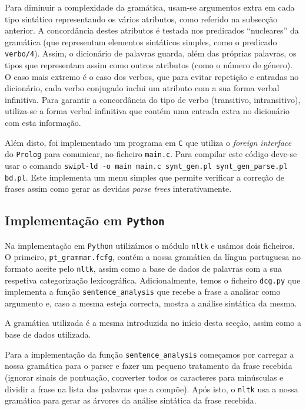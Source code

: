 \documentclass[12pt,a4paper,oneside]{article}
\begin{document}
Para diminuir a complexidade da gramática, usam-se argumentos extra em
cada tipo sintático representando os vários atributos, como referido
na subsecção anterior. A concordância destes atributos é testada nos
predicados ``nucleares'' da gramática (que representam elementos
sintáticos simples, como o predicado \texttt{verbo/4}). Assim, o
dicionário de palavras guarda, além das próprias palavras, os tipos
que representam assim como outros atributos (como o número de
género). O caso mais extremo é o caso dos verbos, que para evitar
repetição e entradas no dicionário, cada verbo conjugado inclui um
atributo com a sua forma verbal infinitiva. Para garantir a
concordância do tipo de verbo (transitivo, intransitivo), utiliza-se a
forma verbal infinitiva que contém uma entrada extra no dicionário com
esta informação.

Além disto, foi implementado um programa em \texttt{C} que utiliza o
\textit{foreign interface} do \texttt{Prolog} para comunicar, no
ficheiro \texttt{main.c}. Para compilar este código deve-se usar o
comando \texttt{swipl-ld -o main main.c synt\_gen.pl
  synt\_gen\_parse.pl bd.pl}. Este implementa um menu simples que
permite verificar a correção de frases assim como gerar as devidas
\textit{parse trees} interativamente.

\subsection{Implementação em \texttt{Python}}

Na implementação em \texttt{Python} utilizámos o módulo \texttt{nltk}
e usámos dois ficheiros. O primeiro, \texttt{pt\_grammar.fcfg}, contém
a nossa gramática da língua portuguesa no formato aceite pelo
\texttt{nltk}, assim como a base de dados de palavras com a sua
respetiva categorização lexicográfica. Adicionalmente, temos o
ficheiro \texttt{dcg.py} que implementa a função
\texttt{sentence\_analysis} que recebe a frase a analisar como
argumento e, caso a mesma esteja correcta, mostra a análise sintática
da mesma.

A gramática utilizada é a mesma introduzida no início desta
secção, assim como a base de dados utilizada.

Para a implementação da função \texttt{sentence\_analysis} começamos
por carregar a nossa gramática para o parser e fazer um pequeno
tratamento da frase recebida (ignorar sinais de pontuação, converter
todos os caracteres para minúsculas e dividir a frase na lista das
palavras que a compõe). Após isto, o \texttt{nltk} usa a nossa
gramática para gerar as árvores da análise sintática da frase
recebida.
\end{document}
